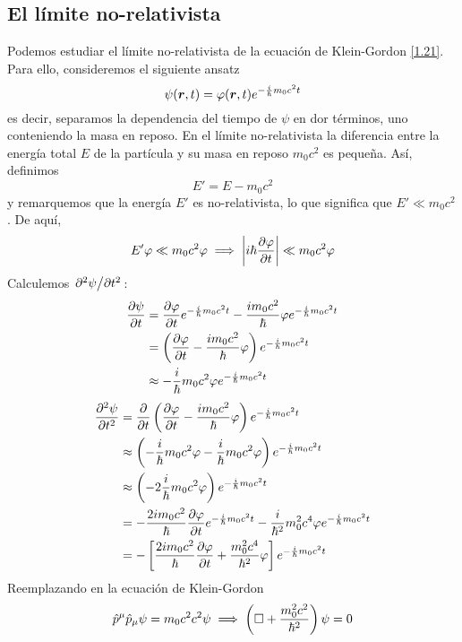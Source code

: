 \subsection{El límite no-relativista}
Podemos estudiar el límite no-relativista de la ecuación de Klein-Gordon \eqref{1.21}. Para ello, consideremos el siguiente ansatz
\begin{equation}
  \psi(\vb*{r},t) =\varphi(\vb*{r},t) e^{-\frac{i}{\hbar}m_0c^2t}
\end{equation}
es decir, separamos la dependencia del tiempo de $\psi$ en dor términos, uno conteniendo la masa en reposo. En el límite no-relativista la diferencia entre la energía total $E$ de la partícula y su masa en reposo $m_0c^2$ es pequeña. Así, definimos
\begin{equation}
  E'=E-m_0c^2
\end{equation}
y remarquemos que la energía $E'$ es no-relativista, lo que significa que $E'\ll m_0c^2$. De aquí,
\begin{equation}
  E'\varphi\ll m_0c^2\varphi\implies \left|i\hbar\pdv{\varphi}{t}\right|\ll m_0c^2\varphi
\end{equation}
Calculemos $\pdv*[2]{\psi}{t}$:
\begin{align}
  \pdv{\psi}{t}&=\pdv{\varphi}{t}e^{-\frac{i}{\hbar}m_0c^2t}-\frac{i m_0c^2}{\hbar}\varphi e^{-\frac{i}{\hbar}m_0c^2t}\\
  &=\left(\pdv{\varphi}{t}-\frac{i m_0c^2}{\hbar}\varphi\right)e^{-\frac{i}{\hbar}m_0c^2t}\\
  &\approx -\frac{i}{\hbar}m_0c^2\varphi e^{-\frac{i}{\hbar}m_0c^2t}
\end{align}
\begin{align}
  \pdv[2]{\psi}{t}&=\pdv{t}\left(\pdv{\varphi}{t}-\frac{i m_0c^2}{\hbar}\varphi\right)e^{-\frac{i}{\hbar}m_0c^2t}\\
  &\approx\left(-\frac{i}{\hbar}m_0c^2\varphi-\frac{i}{\hbar}m_0c^2\varphi\right)e^{-\frac{i}{\hbar}m_0c^2t}\\
  &\approx \left(-2\frac{i}{\hbar}m_0c^2\varphi\right)e^{-\frac{i}{\hbar}m_0c^2t}\\
  &=-\frac{2i m_0c^2}{\hbar}\pdv{\varphi}{t}e^{-\frac{i}{\hbar}m_0c^2t}-\frac{i}{\hbar^2}m_0^2c^4\varphi e^{-\frac{i}{\hbar}m_0c^2t}\\
  &=-\left[\frac{2im_0c^2}{\hbar}\pdv{\varphi}{t}+\frac{m_0^2c^4}{\hbar^2}\varphi\right]e^{-\frac{i}{\hbar}m_0c^2t}
\end{align}
Reemplazando en la ecuación de Klein-Gordon
\begin{equation}
  \hat{p}^\mu \hat{p}_\mu \psi=m_0c^2c^2\psi\implies \left(\Box+\frac{m_0^2c^2}{\hbar{^2}}\right)\psi=0
\end{equation}

